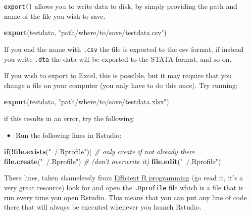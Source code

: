 \documentclass[]{gitbook}
\newenvironment{Shaded}{\begin{snugshade}}{\end{snugshade}}
\newcommand{\CommentTok}[1]{\textcolor[rgb]{0.56,0.35,0.01}{\textit{#1}}}
\newcommand{\ControlFlowTok}[1]{\textcolor[rgb]{0.13,0.29,0.53}{\textbf{#1}}}
\newcommand{\KeywordTok}[1]{\textcolor[rgb]{0.13,0.29,0.53}{\textbf{#1}}}
\newcommand{\NormalTok}[1]{#1}
\newcommand{\OperatorTok}[1]{\textcolor[rgb]{0.81,0.36,0.00}{\textbf{#1}}}
\newcommand{\StringTok}[1]{\textcolor[rgb]{0.31,0.60,0.02}{#1}}
\providecommand{\tightlist}{%
  \setlength{\itemsep}{0pt}\setlength{\parskip}{0pt}}
\begin{document}
\texttt{export()} allows you to write data to disk, by simply providing the path and name of the file you
wish to save.

\begin{Shaded}
\begin{Highlighting}[]
\KeywordTok{export}\NormalTok{(testdata, }\StringTok{"path/where/to/save/testdata.csv"}\NormalTok{)}
\end{Highlighting}
\end{Shaded}

If you end the name with \texttt{.csv} the file is exported to the csv format, if instead you write \texttt{.dta}
the data will be exported to the STATA format, and so on.

If you wish to export to Excel, this is possible, but it may require that you change a file on your
computer (you only have to do this once). Try running:

\begin{Shaded}
\begin{Highlighting}[]
\KeywordTok{export}\NormalTok{(testdata, }\StringTok{"path/where/to/save/testdata.xlsx"}\NormalTok{)}
\end{Highlighting}
\end{Shaded}

if this results in an error, try the following:

\begin{itemize}
\tightlist
\item
  Run the following lines in Rstudio:
\end{itemize}

\begin{Shaded}
\begin{Highlighting}[]
\ControlFlowTok{if}\NormalTok{(}\OperatorTok{!}\KeywordTok{file.exists}\NormalTok{(}\StringTok{"~/.Rprofile"}\NormalTok{)) }\CommentTok{# only create if not already there}
    \KeywordTok{file.create}\NormalTok{(}\StringTok{"~/.Rprofile"}\NormalTok{)    }\CommentTok{# (don't overwrite it)}
\KeywordTok{file.edit}\NormalTok{(}\StringTok{"~/.Rprofile"}\NormalTok{)}
\end{Highlighting}
\end{Shaded}

These lines, taken shamelessly from \href{https://csgillespie.github.io/efficientR/3-3-r-startup.html\#rprofile}{Efficient R
programming} (go read it,
it's a very great resource) look for and open the \texttt{.Rprofile} file which is a file that is run
every time you open Rstudio. This means that you can put any line of code there that will always be
executed whenever you launch Rstudio.
\end{document}
